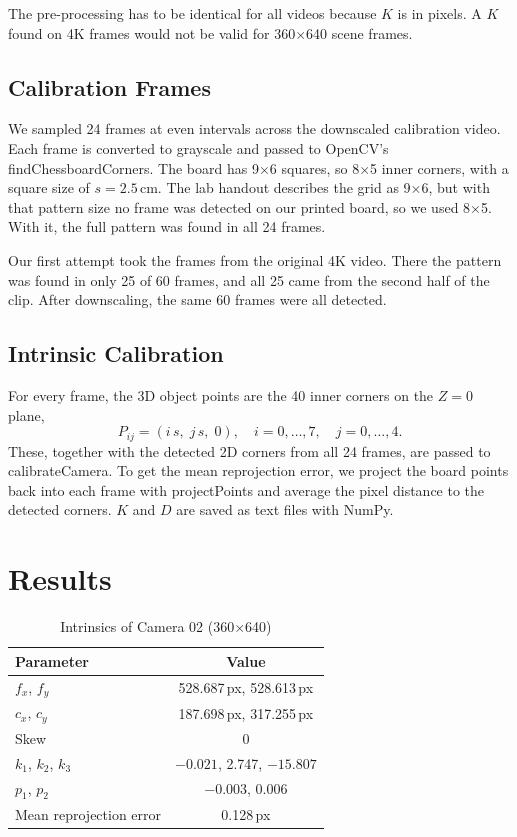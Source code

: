 \documentclass[conference]{assets/latex/IEEEtran}
\begin{document}
The pre-processing has to be identical for all videos because $K$ is in pixels. A $K$ found on 4K frames would not be valid for 360$\times$640 scene frames.

\subsection{Calibration Frames}
We sampled 24 frames at even intervals across the downscaled calibration video. Each frame is converted to grayscale and passed to OpenCV's findChessboardCorners. The board has 9$\times$6 squares, so 8$\times$5 inner corners, with a square size of $s = 2.5$\,cm. The lab handout describes the grid as 9$\times$6, but with that pattern size no frame was detected on our printed board, so we used 8$\times$5. With it, the full pattern was found in all 24 frames.

Our first attempt took the frames from the original 4K video. There the pattern was found in only 25 of 60 frames, and all 25 came from the second half of the clip. After downscaling, the same 60 frames were all detected.

\subsection{Intrinsic Calibration}
For every frame, the 3D object points are the 40 inner corners on the $Z = 0$ plane,
\begin{equation}
P_{ij} = (i\,s,\; j\,s,\; 0), \quad i = 0,\dots,7, \quad j = 0,\dots,4.
\end{equation}
These, together with the detected 2D corners from all 24 frames, are passed to calibrateCamera. To get the mean reprojection error, we project the board points back into each frame with projectPoints and average the pixel distance to the detected corners. $K$ and $D$ are saved as text files with NumPy.

\section{Results}

\begin{table}
\caption{Intrinsics of Camera 02 (360$\times$640)}
\begin{center}
\begin{tabular}{|l|c|}
\hline
\textbf{Parameter} & \textbf{Value} \\
\hline
$f_x$, $f_y$ & 528.687\,px, 528.613\,px \\
$c_x$, $c_y$ & 187.698\,px, 317.255\,px \\
Skew & 0 \\
$k_1$, $k_2$, $k_3$ & $-0.021$, 2.747, $-15.807$ \\
$p_1$, $p_2$ & $-0.003$, 0.006 \\
Mean reprojection error & 0.128\,px \\
\hline
\end{tabular}
\label{tab:cam02}
\end{center}
\end{table}
\end{document}
